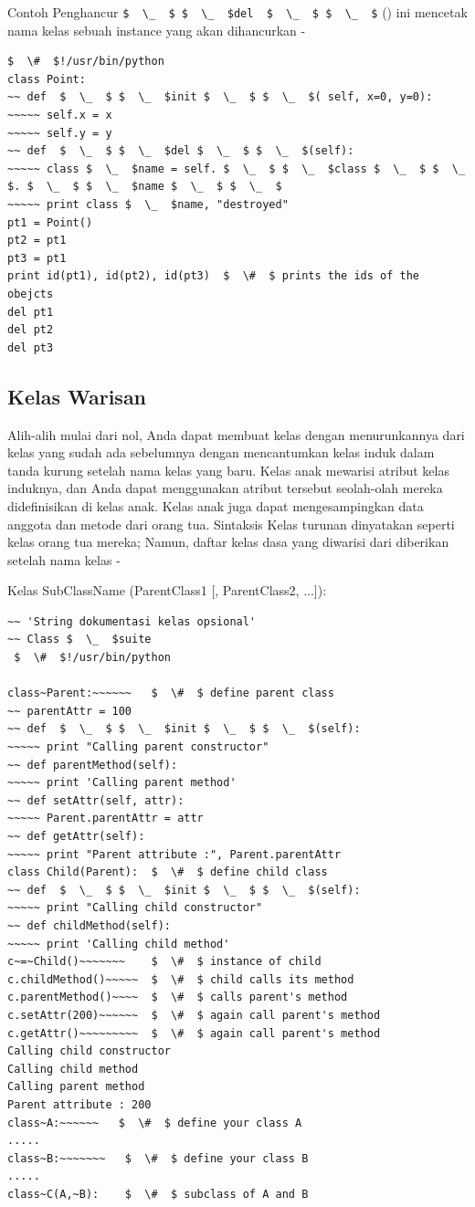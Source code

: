 Contoh
Penghancur  \verb|$  \_  $ $  \_  $del  $  \_  $ $  \_  $| () ini mencetak nama kelas sebuah instance yang akan dihancurkan -
\begin{verbatim}
$  \#  $!/usr/bin/python
class Point:
~~ def  $  \_  $ $  \_  $init $  \_  $ $  \_  $( self, x=0, y=0):
~~~~~ self.x = x
~~~~~ self.y = y
~~ def  $  \_  $ $  \_  $del $  \_  $ $  \_  $(self):
~~~~~ class $  \_  $name = self. $  \_  $ $  \_  $class $  \_  $ $  \_  $. $  \_  $ $  \_  $name $  \_  $ $  \_  $
~~~~~ print class $  \_  $name, "destroyed"
pt1 = Point()
pt2 = pt1
pt3 = pt1
print id(pt1), id(pt2), id(pt3)  $  \#  $ prints the ids of the obejcts
del pt1
del pt2
del pt3
\end{verbatim}

\subsection{Kelas Warisan}
Alih-alih mulai dari nol, Anda dapat membuat kelas dengan menurunkannya dari kelas yang sudah ada sebelumnya dengan mencantumkan kelas induk dalam tanda kurung setelah nama kelas yang baru. Kelas anak mewarisi atribut kelas induknya, dan Anda dapat menggunakan atribut tersebut seolah-olah mereka didefinisikan di kelas anak. Kelas anak juga dapat mengesampingkan data anggota dan metode dari orang tua. Sintaksis Kelas turunan dinyatakan seperti kelas orang tua mereka; Namun, daftar kelas dasa yang diwarisi dari diberikan setelah nama kelas -

Kelas SubClassName (ParentClass1 [, ParentClass2, ...]):
\begin{verbatim}
~~ 'String dokumentasi kelas opsional'
~~ Class $  \_  $suite
 $  \#  $!/usr/bin/python

class~Parent:~~~~~~   $  \#  $ define parent class
~~ parentAttr = 100
~~ def  $  \_  $ $  \_  $init $  \_  $ $  \_  $(self):
~~~~~ print "Calling parent constructor"
~~ def parentMethod(self):
~~~~~ print 'Calling parent method'
~~ def setAttr(self, attr):
~~~~~ Parent.parentAttr = attr
~~ def getAttr(self):
~~~~~ print "Parent attribute :", Parent.parentAttr
class Child(Parent):  $  \#  $ define child class
~~ def  $  \_  $ $  \_  $init $  \_  $ $  \_  $(self):
~~~~~ print "Calling child constructor"
~~ def childMethod(self):
~~~~~ print 'Calling child method'
c~=~Child()~~~~~~~    $  \#  $ instance of child
c.childMethod()~~~~~  $  \#  $ child calls its method
c.parentMethod()~~~~  $  \#  $ calls parent's method
c.setAttr(200)~~~~~~  $  \#  $ again call parent's method
c.getAttr()~~~~~~~~~  $  \#  $ again call parent's method
Calling child constructor
Calling child method
Calling parent method
Parent attribute : 200
class~A:~~~~~~   $  \#  $ define your class A
.....
class~B:~~~~~~~   $  \#  $ define your class B
.....
class~C(A,~B):    $  \#  $ subclass of A and B
\end{verbatim}

